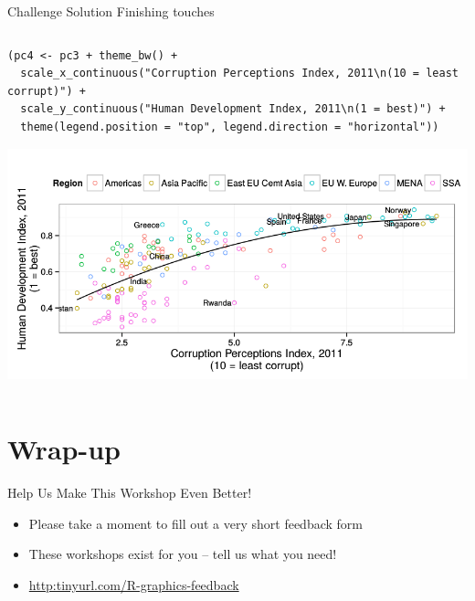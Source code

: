 \documentclass[table,smaller]{beamer}
\begin{document}
\begin{frame}[fragile,label=sec-8-6]{Challenge Solution}
 Finishing touches

\begin{columns}  \begin{block}{}

\begin{verbatim}
(pc4 <- pc3 + theme_bw() +
  scale_x_continuous("Corruption Perceptions Index, 2011\n(10 = least corrupt)") +
  scale_y_continuous("Human Development Index, 2011\n(1 = best)") +
  theme(legend.position = "top", legend.direction = "horizontal"))
\end{verbatim}

\includegraphics[width=.9\linewidth]{images/econScatter4.png}

\end{block} \end{columns}
\end{frame}

\section{Wrap-up}
\label{sec-9}

\begin{frame}[label=sec-9-1]{Help Us Make This Workshop Even Better!}
\begin{itemize}
\item Please take a moment to fill out a very short feedback form
\item These workshops exist for you -- tell us what you need!
\item \url{http:tinyurl.com/R-graphics-feedback}
\end{itemize}
\end{frame}
\end{document}
